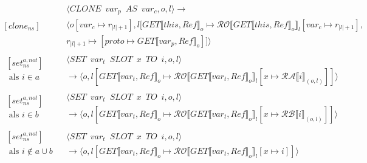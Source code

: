\documentclass[12pt]{article}
\newcommand{\RA}{\mathcal{RA}}
\newcommand{\RB}{\mathcal{RB}}
\newcommand{\RO}{\mathcal{RO}}
\begin{document}
\[
\begin{matrix}
[clone_{ns}] &
\begin{matrix}
\langle CLONE \enspace var_p \enspace AS \enspace var_c, o, l\rangle 
\rightarrow\\
\langle o[var_c \mapsto r_{|l|+1}], l[GET \llbracket this, Ref \rrbracket_o \mapsto \RO \llbracket GET \llbracket this, Ref \rrbracket_o \rrbracket_l[var_c \mapsto r_{|l|+1}] ,\\ r_{|l|+1} \mapsto [ proto \mapsto GET \llbracket var_p, Ref \rrbracket_o]]\rangle
\end{matrix}\\
\begin{matrix}
[set_{ns}^{a,not}]\\
\mbox{ als } i \in a\\
\end{matrix} &
\begin{matrix}
\langle SET \enspace var_t \enspace SLOT \enspace x \enspace TO \enspace i, o, l \rangle\\
\rightarrow
\langle o, l[GET \llbracket var_t, Ref \rrbracket_o \mapsto \RO \llbracket GET \llbracket var_t, Ref \rrbracket_o \rrbracket_l[x \mapsto \RA 
\llbracket i \rrbracket_{(o,l)}]] \rangle
\end{matrix}\\
\begin{matrix}
[set_{ns}^{a,not}]\\
\mbox{ als } i \in b\\
\end{matrix} &
\begin{matrix}
\langle SET \enspace var_t \enspace SLOT \enspace x \enspace TO \enspace i, o, l \rangle\\
\rightarrow
\langle o, l[GET \llbracket var_t, Ref \rrbracket_o \mapsto \RO \llbracket GET \llbracket var_t, Ref \rrbracket_o \rrbracket_l[x \mapsto \RB 
\llbracket i \rrbracket_{(o,l)}]] \rangle
\end{matrix}\\\begin{matrix}
[set_{ns}^{a,not}]\\
\mbox{ als } i \not\in a \cup b\\
\end{matrix} &
\begin{matrix}
\langle SET \enspace var_t \enspace SLOT \enspace x \enspace TO \enspace i, o, l \rangle\\
\rightarrow
\langle o, l[GET \llbracket var_t, Ref \rrbracket_o \mapsto \RO \llbracket GET \llbracket var_t, Ref \rrbracket_o \rrbracket_l[x \mapsto i ]] \rangle

\end{matrix}
\end{matrix}\]
\end{document}
